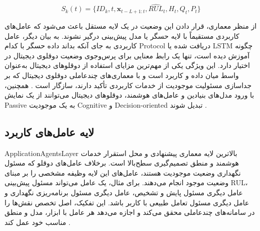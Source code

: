 \begin{equation}\label{eq:digital-agent-parameter}
 S_k(t)=\{ID_k,t,\mathbf{x}_{t-L+1:t},\widehat{RUL}_t,H_t,Q_t,P_t\}
\end{equation}


از منظر معماری، قرار دادن این وضعیت در یک لایه مستقل باعث می‌شود که عامل‌های کاربردی مستقیماً با لایه حسگر یا مدل پیش‌بینی درگیر نشوند. به بیان دیگر، عامل کاربردی به جای آنکه بداند داده حسگر با کدام \gls{Protocol} دریافت شده یا LSTM چگونه آموزش دیده است، تنها یک رابط معنایی برای پرس‌وجوی وضعیت دوقلوی دیجیتال در اختیار دارد. این ویژگی یکی از مهم‌ترین مزایای استفاده از دوقلو‌های دیجیتال به‌عنوان واسط میان داده و کاربرد است و با معماری‌های چندعاملی دوقلوی دیجیتال که بر جداسازی مسئولیت موجودیت از خدمات کاربردی تأکید دارند، سازگار است \cite{pretel2022masdt,lopez2024madtwin,wang2024multiagent}. همچنین، با ورود مدل‌های بنیادین و عامل‌های هوشمند، دوقلوهای دیجیتال می‌توانند از یک نمایش \gls{Passive} به یک موجودیت \gls{Cognitive} و \gls{Decision-oriented} تبدیل شوند \cite{zhou2026dtai,fu2026genaidt}.


\subsection{لایه عامل‌های کاربرد}
\label{sec:layer-app-agents}

\gls{ApplicationAgentsLayer} بالاترین لایه معماری پیشنهادی و محل استقرار خدمات هوشمند و منطق تصمیم‌گیری سطح‌بالا است. برخلاف عامل‌های دوقلو که مسئول نگهداری وضعیت موجودیت هستند، عامل‌های این لایه وظیفه مشخصی را بر مبنای وضعیت موجود انجام می‌دهند. برای مثال، یک عامل می‌تواند مسئول پیش‌بینی \gls{RUL}، عامل دیگری مسئول پایش و تشخیص، عامل دیگری مسئول برنامه‌ریزی نگهداری و عامل دیگری مسئول تعامل طبیعی با کاربر باشد. این تفکیک، اصل تخصص نقش‌ها را در سامانه‌های چندعاملی محقق می‌کند و اجازه می‌دهد هر عامل با ابزار، مدل و منطق مناسب خود عمل کند \cite{dorri2018multiagent,pretel2022masdt,wang2024multiagent}.


